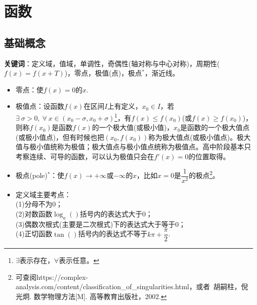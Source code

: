 \chapter{函数}

\section{基础概念}
\noindent \textbf{关键词}：定义域，值域，单调性，奇偶性(轴对称与中心对称)，周期性($ f(x)=f(x+T) $)，零点，极值(点)，极点$ ^* $，渐近线。 

\begin{itemize}[leftmargin=\inteval{\myitemleftmargin}pt,itemsep=
   \inteval{\myitemitempsep}pt,topsep=\inteval{\myitemtopsep}pt]
\item 零点：使$ f(x)=0 $的$ x $. 
\item 极值点：设函数$ f(x) $在区间$ I $上有定义，$ x_0\in I $，若$ \exists\ \sigma>0,\ \forall\ x\in(x_0-\sigma,x_0+\sigma) $\footnote{$ \exists $表示存在，$ \forall $表示任意。}，有$ f(x)\leq f(x_0) $(或$ f(x)\geq f(x_0) $)，则称$ f(x_0) $是函数$ f(x) $的一个极大值(或极小值)，$ x_0 $是函数的一个极大值点(或极小值点)，但有时候也把$ (x_0,f(x_0)) $称为极大值点(或极小值点)。极大值与极小值统称为极值；极大值点与极小值点统称为极值点。高中阶段基本只考察连续、可导的函数，可以认为极值只会在$ f'(x)=0 $的位置取得。
\item 极点(pole)$ ^* $：使$ f(x)\to +\infty $或$-\infty $的$ x $，比如$ x=0 $是$ \dfrac{1}{x^2} $的极点\footnote{可查阅https://complex-analysis.com/content/classification\_of\_singularities.html，或者\ 胡嗣柱，倪光炯. 数学物理方法[M]. 高等教育出版社，2002. }。

\item 定义域主要考点：\\
(1)分母不为0；\\
(2)对数函数$ \log_a() $括号内的表达式大于0；\\
(3)偶数次根式(主要是二次根式)下的表达式大于等于0；\\
(4)正切函数$ \tan() $括号内的表达式不等于$ k\pi+\dfrac{\pi}{2} $. 

\end{itemize}

